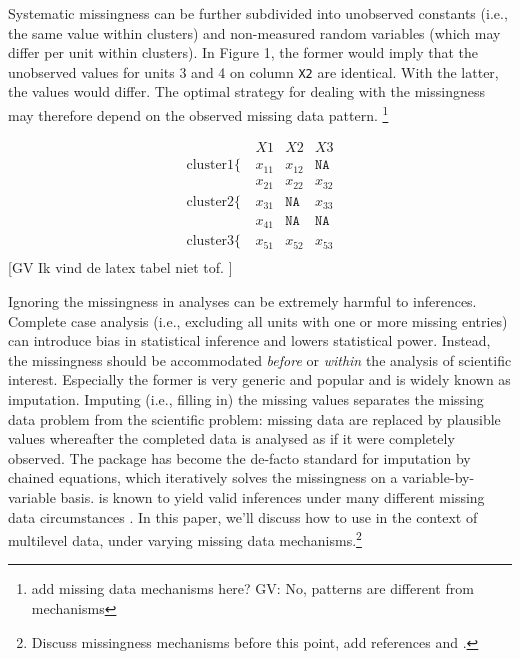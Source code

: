 \documentclass[
]{jss}
\begin{document}
Systematic missingness can be further subdivided into unobserved
constants (i.e., the same value within clusters) and non-measured random
variables (which may differ per unit within clusters). In Figure 1, the
former would imply that the unobserved values for units 3 and 4 on
column \texttt{X2} are identical. With the latter, the values would
differ. The optimal strategy for dealing with the missingness may
therefore depend on the observed missing data pattern. \footnote{add
  missing data mechanisms here? GV: No, patterns are different from
  mechanisms}

\[
\begin{matrix} 
                          &X1     & X2          & X3            \\
   \hline
   \mathrm{cluster 1}\{ \ &x_{11} &x_{12}       &\mathtt{NA}    \\
                             \ &x_{21}  &x_{22}       &x_{32}         \\
   \mathrm{cluster 2}\{  &x_{31} &\mathtt{NA}  &x_{33}         \\
                          &x_{41} &\mathtt{NA}  &\mathtt{NA}    \\
   \mathrm{cluster 3}\{  &x_{51} &x_{52}       &x_{53}         \\
\end{matrix} 
\] {[}GV Ik vind de latex tabel niet tof. {]}

Ignoring the missingness in analyses can be extremely harmful to
inferences. Complete case analysis (i.e., excluding all units with one
or more missing entries) can introduce bias in statistical inference and
lowers statistical power. Instead, the missingness should be
accommodated \emph{before} or \emph{within} the analysis of scientific
interest. Especially the former is very generic and popular and is
widely known as imputation. Imputing (i.e., filling in) the missing
values separates the missing data problem from the scientific problem:
missing data are replaced by plausible values whereafter the completed
data is analysed as if it were completely observed. The 
package  has become the de-facto standard for imputation by
chained equations, which iteratively solves the missingness on a
variable-by-variable basis.  is known to yield valid
inferences under many different missing data circumstances
\citep{buur18}. In this paper, we'll discuss how to use  in
the context of multilevel data, under varying missing data
mechanisms.\footnote{Discuss missingness mechanisms before this point,
  add references \citet{yuce08} and \citet{hox15}.}
\end{document}
